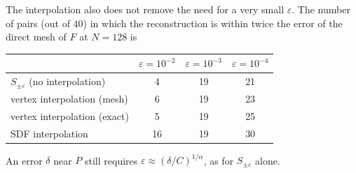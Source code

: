 \documentclass[12pt, a4paper, oneside]{book}
\theoremstyle{plain}
\theoremstyle{definition}
\theoremstyle{remark}
\theoremstyle{definition}
\begin{document}
The interpolation also does not remove the need for a very small $\varepsilon$. The number of pairs (out of $40$) in which the reconstruction is within twice the error of the direct mesh of $F$ at $N=128$ is
\begin{center}
\small
\begin{tabular}{l c c c}
\toprule
& $\varepsilon=10^{-2}$ & $\varepsilon=10^{-3}$ & $\varepsilon=10^{-4}$ \\
\midrule
$S_{\pm\varepsilon}$ (no interpolation) & 4 & 19 & 21 \\
vertex interpolation (mesh) & 6 & 19 & 23 \\
vertex interpolation (exact) & 5 & 19 & 25 \\
SDF interpolation & 16 & 19 & 30 \\
\bottomrule
\end{tabular}
\end{center}
An error $\delta$ near $P$ still requires $\varepsilon\approx(\delta/C)^{1/\alpha}$, as for $S_{\pm\varepsilon}$ alone.
\end{document}
